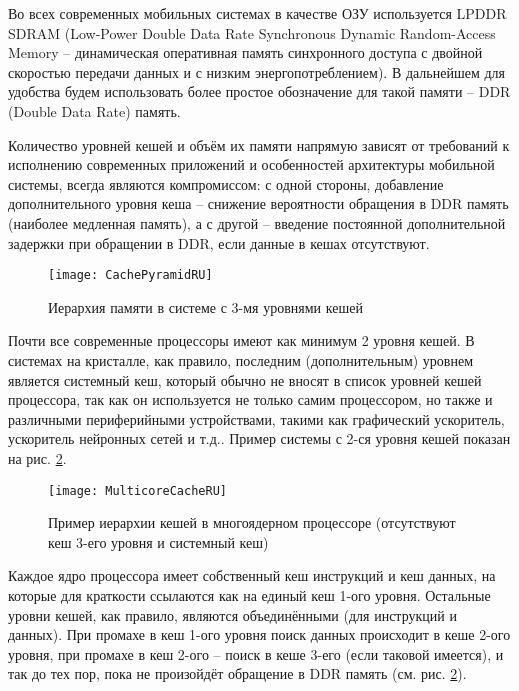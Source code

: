     Во всех современных мобильных системах в качестве ОЗУ используется LPDDR SDRAM
    (Low-Power Double Data Rate Synchronous Dynamic Random-Access Memory --
    динамическая оперативная память синхронного доступа с двойной скоростью передачи данных и
    с низким энергопотреблением). В дальнейшем для удобства будем использовать более простое
    обозначение для такой памяти -- DDR (Double Data Rate) память.

    Количество уровней кешей и объём их памяти напрямую зависят от требований к исполнению
    современных приложений и особенностей архитектуры мобильной системы,
    всегда являются компромиссом: с одной стороны, добавление дополнительного
    уровня кеша -- снижение вероятности обращения в DDR память (наиболее медленная память),
    а с другой -- введение постоянной дополнительной задержки при обращении в DDR, если данные
    в кешах отсутствуют.

    \begin{figure}[!h]
        \caption{Иерархия памяти в системе с 3-мя уровнями кешей}
        \centering
        \texttt{[image: CachePyramidRU]}
        \label{CachePyramid}
    \end{figure}

    Почти все современные процессоры имеют как минимум 2 уровня кешей. В системах на кристалле,
    как правило, последним (дополнительным) уровнем является системный кеш, который обычно
    не вносят в список уровней кешей процессора, так как он используется не только самим процессором,
    но также и различными периферийными устройствами, такими как графический ускоритель, ускоритель
    нейронных сетей и т.д.. Пример системы с 2-ся уровня кешей показан на рис. \ref{MulticoreCache}.

    \begin{figure}[!h]
        \caption{Пример иерархии кешей в многоядерном процессоре (отсутствуют кеш 3-его уровня
            и системный кеш)}
        \centering
        \texttt{[image: MulticoreCacheRU]}
        \label{MulticoreCache}
    \end{figure}

    Каждое ядро процессора имеет собственный кеш инструкций и кеш данных, на которые для краткости
    ссылаются как на единый кеш 1-ого уровня. Остальные уровни кешей, как правило, являются объединёнными
    (для инструкций и данных).
    При промахе в кеш 1-ого уровня поиск данных происходит в кеше 2-ого уровня, при промахе
    в кеш 2-ого -- поиск в кеше 3-его (если таковой имеется), и так до тех пор, пока не произойдёт
    обращение в DDR память (см. рис. \ref{MulticoreCache}).

